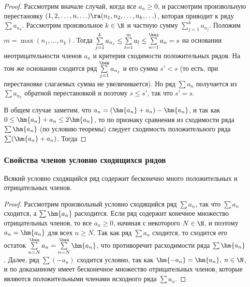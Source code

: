 \documentclass[a4paper]{article}
\begin{document}
\begin{proof}
Рассмотрим вначале случай, когда все $a_n\ge0$, и рассмотрим
произвольную перестановку $(1,2,\ldots,n,\ldots) \ra
(n_1,n_2,\ldots,n_k,\ldots)$, которая приводит к ряду $\sum
a_{n_k}$. Рассмотрим произвольное $k\in\N$ и частную сумму
$\sum\limits_{j=1}^k a_{n_j}$. Положим $m=\max(n_1,\ldots,n_k)$.
Тогда $\sum\limits_{j=1}^k a_{n_j} \le \sum\limits_{l=1}^m a_l \le
\sum\limits_{n=1}^{\bes} a_n = s$ на основании неотрицательности
членов $a_n$ и критерия сходимости положительных рядов. На том же
основании сходится ряд $\sum\limits_{j=1}^{\bes} a_{n_j}$ и его
сумма $s'<s$ (то есть, при перестановке слагаемых сумма не
увеличивается). Но ряд $\sum a_n$ получается из $\sum a_{n_k}$
обратной перестановкой и поэтому $s\le s'$, так что $s'=s$.

В общем случае заметим, что $a_n = (\hm{a_n} + a_n) - \hm{a_n}$, и
так как $0 \le \hm{a_n} + a_n \le 2\hm{a_n}$, то по признаку
сравнения из сходимости ряда $\sum \hm{a_n}$ (по условию теоремы)
следует сходимость положительного ряда $\sum (\hm{a_n} + a_n)$.
Тогда 
\end{proof}

\subsubsection{Свойства членов условно сходящихся рядов}
\begin{theorem}\label{thm1.31}
Всякий условно сходящийся ряд содержит бесконечно много
положительных и отрицательных членов.
\end{theorem}

\begin{proof}
Рассмотрим произвольный условно сходящийся ряд $\sum a_n$, так что
$\sum a_n$ сходится, а $\sum \hm{a_n}$ расходится. Если ряд содержит
конечное множество отрицательных членов, то все $a_n\ge0$, начиная с
некоторого $N\in\N$, и поэтому $a_n=\hm{a_n}$ для всех $n\ge N$. Так
как ряд $\sum a_n$ сходится, то сходится его остаток
$\sum\limits_{n=N}^{\bes} a_n = \sum\limits_{n=N}^{\bes} \hm{a_n}$,
что противоречит расходимости ряда $\sum \hm{a_n}$. Далее, ряд $\sum
(-a_n)$ сходится условно, так как $\hm{-a_n} = \hm{a_n}, \; n\in\N$,
и по доказанному имеет бесконечное множество отрицательных членов,
которые являются положительными членами исходного ряда $\sum a_n$.
\end{proof}
\end{document}
